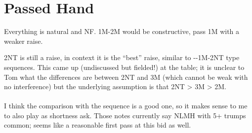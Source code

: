 \documentclass[tom-ari]{subfile}
\begin{document}
\section{Passed Hand}

Everything is natural and NF. 1M-2M would be constructive, pass 1M with a weaker raise.

\begin{noted}
2NT is still a raise, in context it is the ``best'' raise, similar to --1M-2NT type sequences.  This came up (undiscussed but fielded!) at the table; it is unclear to Tom what the differences are between 2NT and 3M (which cannot be weak with no interference) but the underlying assumption is that 2NT > 3M > 2M. \\
\\
I think the comparison with the  sequence is a good one, so it makes sense to me to also play  as shortness ask.  Those notes currently say NLMH with 5+ trumps common; seems like a reasonable first pass at this bid as well.
\end{noted}

	  
\end{document}

